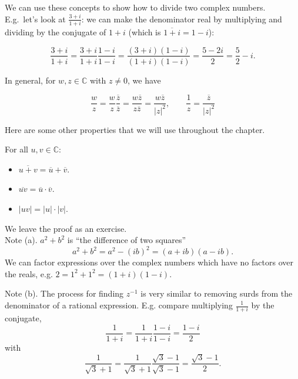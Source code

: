 \documentclass[11pt,dvipsnames]{book}
\numberwithin{equation}{section} %
\numberwithin{figure}{section} %
\numberwithin{table}{section} %
\begin{document}
We can use these concepts to show how to divide two complex numbers.  E.g.~let's look at $\frac{3+i}{1+i}$: we can make the denominator real by multiplying and dividing by the conjugate of $1+i$ (which is $\overline{1+i}=1-i$):

$$\frac{3+i}{1+i}=\frac{3+i}{1+i}\frac{1-i}{1-i} = \frac{(3+i)(1-i)}{(1+i)(1-i)} = \frac{5-2i}{2}=\frac{5}{2}-i.
$$

In general, for $w,z\in\mathbb{C}$ with $z\neq 0$, we have

\begin{equation}
\label{e:1/z}
 \frac{w}{z} = \frac{w}{z}\frac{\overline z}{\overline z} = \frac{w\overline z}{z\overline z} = \frac{w\overline z}{|z|^2}, \;\; \;\;\;\;\;\frac{1}{z} = \frac{\overline{z}}{|z|^2}
 \end{equation}

Here are some other properties that we will use throughout the chapter.

\begin{lemma}
\label{l:modulus-rules}
For all $u,v\in \mathbb{C}$:
\begin{itemize}
\item $\overline{u+v} = \overline{u}+\overline{v}$.
\item $\overline{uv} = \overline{u}\cdot\overline{v}$.
\item $|uv|=|u|\cdot|v|$.
\end{itemize}
\end{lemma}

We leave the proof as an exercise.\\

Note (a).  \(a^2+b^2\) is ``the difference of two squares'' 
\[ a^2+b^2 = a^2-(ib)^2 = (a+ib)(a-ib).\]
We can factor expressions over the complex numbers which have no factors over the reals, e.g. \(2=1^2+1^2=(1+i)(1-i)\).

Note (b). The process for finding \(z^{-1}\) is very similar to removing surds from the denominator of a rational expression. 
E.g. compare multiplying \(\frac{1}{1+i}\) by the conjugate, \[ \frac{1}{1+i} = \frac{1}{1+i}\frac{1-i}{1-i}= \frac{1-i}{2}\]
with
\[ \frac{1}{\sqrt{3}+1} = \frac{1}{\sqrt{3}+1}\frac{\sqrt{3}-1}{\sqrt{3}-1}= \frac{\sqrt{3}-1}{2} .\]
\end{document}
